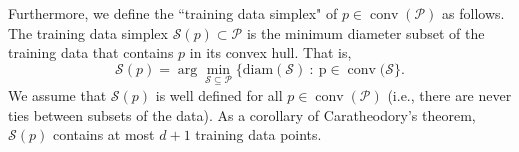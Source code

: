 \documentclass[10pt]{article} %
\theoremstyle{plain}
\theoremstyle{definition}
\theoremstyle{remark}
\begin{document}
Furthermore, we define the ``training data simplex" of $p \in \operatorname{conv}(\mathcal{P})$ as follows. The training data simplex $\mathcal{S}(p) \subset \mathcal{P}$ is the minimum diameter subset of the training data that contains $p$ in its convex hull. That is,
\[
\mathcal{S}(p) = \arg \min_{\mathcal{S} \subseteq \mathcal{P}} \{ \operatorname{diam(\mathcal{S}) ~:~ p \in \operatorname{conv}(\mathcal{S}} \}.
\]
We assume that $\mathcal{S}(p)$ is well defined for all $p \in \operatorname{conv}(\mathcal{P})$ (i.e., there are never ties between subsets of the data). As a corollary of Caratheodory's theorem, $\mathcal{S}(p)$ contains at most $d+1$ training data points.




\end{document}
